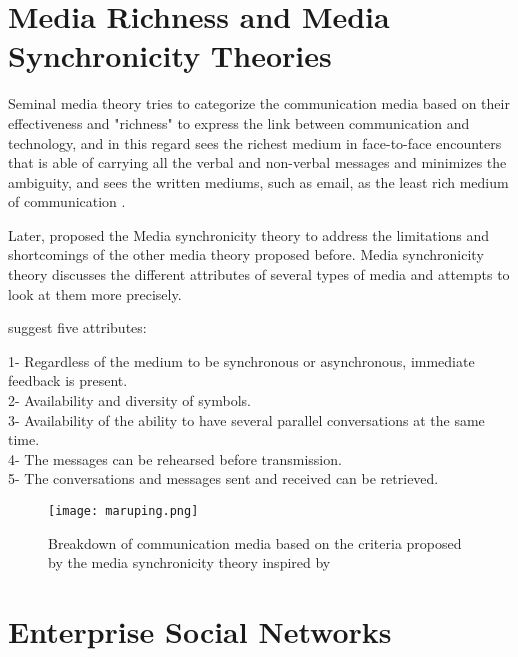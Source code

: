 \section{Media Richness and Media Synchronicity Theories}

Seminal media theory tries to categorize the communication media based on their effectiveness and "richness" to express the link between communication and technology, and in this regard sees the richest medium in face-to-face encounters that is able of carrying all the verbal and non-verbal messages and minimizes the ambiguity, and sees the written mediums, such as email, as the least rich medium of communication \citep{Daft1986,Hassell2016}.

Later, \citet{Dennis2008} proposed the Media synchronicity theory to address the limitations and shortcomings of the other media theory proposed before. Media synchronicity theory discusses the different attributes of several types of media and attempts to look at them more precisely.

\citet{Dennis2008} suggest five attributes:

1- Regardless of the medium to be synchronous or asynchronous, immediate feedback is present.\\
2- Availability and diversity of symbols.\\
3- Availability of the ability to have several parallel conversations at the same time.\\
4- The messages can be rehearsed before transmission.\\
5- The conversations and messages sent and received can be retrieved.\\


\begin{figure}[hbt!]
\centering
\texttt{[image: maruping.png]}
\caption{Breakdown of communication media based on the criteria proposed by the media synchronicity theory inspired by \citet{Maruping2004}}\label{fig:maruping}
\end{figure}

\section{Enterprise Social Networks}

